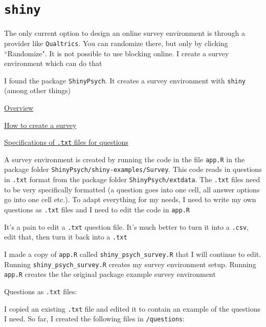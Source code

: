 \section*{\texttt{shiny}}
	\begin{coi}
		\item The only current option to design an online survey environment is through a provider like \texttt{Qualtrics}. You can randomize there, but only by clicking ``Randomize". It is not possible to use blocking online. I create a survey environment which can do that
		\item I found the package {\tt ShinyPsych}. It creates a survey environment with {\tt shiny} (among other things)
			\begin{coi}
				\item \href{http://rstudio-pubs-static.s3.amazonaws.com/302907_9491d773d4f147c3ac8e0b29d301846a.html#about_shinypsych}{Overview}
				\item \href{http://rstudio-pubs-static.s3.amazonaws.com/302891_3a8f5170171545248977bbb7b015f546.html#what_is_this_tutorial_about}{How to create a survey}
				\item \href{http://rpubs.com/msteiner/ShinyPsych_TextfileTutorial}{Specifications of {\tt .txt} files for questions}
			\end{coi}
		\item A survey environment is created by running the code in the file {\tt app.R} in the package folder {\tt ShinyPsych/shiny-examples/Survey}. This code reads in questions in {\tt .txt} format from the package folder {\tt ShinyPsych/extdata}. The {\tt .txt} files need to be very specifically formatted (a question goes into one cell, all answer options go into one cell etc.). To adapt everything for my needs, I need to write my own questions as {\tt .txt} files and I need to edit the code in {\tt app.R}
		\item  It's a pain to edit a {\tt .txt} question file. It's much better to turn it into a {\tt .csv}, edit that, then turn it back into a {\tt .txt}
		\item I made a copy of {\tt app.R} called {\tt shiny\_psych\_survey.R} that I will continue to edit. Running {\tt shiny\_psych\_survey.R} creates my survey environment setup. Running {\tt app.R} creates the the original package example survey environment
		\item Questions as {\tt .txt} files:
			\begin{coi}
				\item I copied an existing {\tt .txt} file and edited it to contain an example of the questions I need. So far, I created the following files in {\tt /questions}:

\end{coi}
\end{coi}
